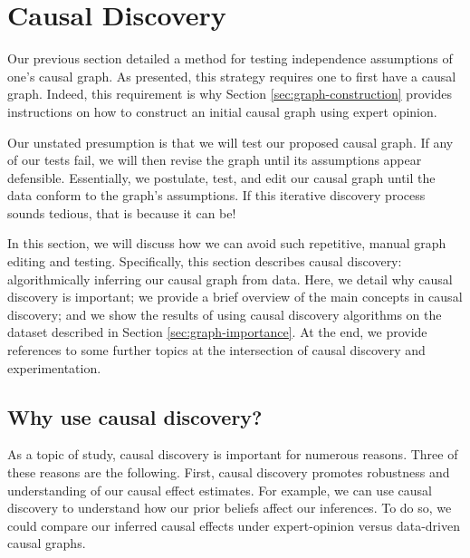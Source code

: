 \section{Causal Discovery}
\label{sec:causal-discovery}

Our previous section detailed a method for testing independence assumptions of one's causal graph.
As presented, this strategy requires one to first have a causal graph.
Indeed, this requirement is why Section \ref{sec:graph-construction} provides instructions on how to construct an initial causal graph using expert opinion.

Our unstated presumption is that we will test our proposed causal graph.
If any of our tests fail, we will then revise the graph until its assumptions appear defensible.
Essentially, we postulate, test, and edit our causal graph until the data conform to the graph's assumptions.
If this iterative discovery process sounds tedious, that is because it can be!

In this section, we will discuss how we can avoid such repetitive, manual graph editing and testing.
Specifically, this section describes causal discovery:
algorithmically inferring our causal graph from data.
Here, we detail why causal discovery is important;
we provide a brief overview of the main concepts in causal discovery;
and we show the results of using causal discovery algorithms on the dataset described in Section \ref{sec:graph-importance}.
At the end, we provide references to some further topics at the intersection of causal discovery and experimentation.

\subsection{Why use causal discovery?}
\label{sec:why-causal-discovery}

As a topic of study, causal discovery is important for numerous reasons.
Three of these reasons are the following.
First, causal discovery promotes robustness and understanding of our causal effect estimates.
For example, we can use causal discovery to understand how our prior beliefs affect our inferences.
To do so, we could compare our inferred causal effects under expert-opinion versus data-driven causal graphs.

